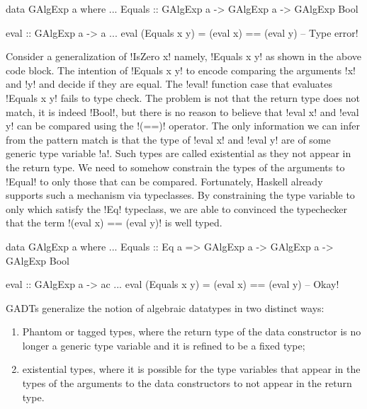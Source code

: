 \documentclass[manuscript,screen,nonacm]{acmart}
\begin{document}
\begin{minipage}[ht]{0.5\linewidth}
\begin{code}
data GAlgExp a where
  ...
  Equals :: GAlgExp a -> GAlgExp a -> GAlgExp Bool
\end{code}
\end{minipage}%
\begin{minipage}[ht]{0.4\linewidth}
\begin{code}
eval :: GAlgExp a -> a
...
eval (Equals x y) = (eval x) == (eval y) -- Type error!
\end{code}
\end{minipage}

Consider a generalization of !IsZero x! namely, !Equals x y! as shown in the above code block. The intention of !Equals x y! to encode comparing the arguments !x! and !y! and decide if they are equal. The !eval! function case that evaluates !Equals x y! fails to type check. The problem is not that the return type does not match, it is indeed !Bool!, but there is no reason to believe that !eval x! and !eval y! can be compared using the !(==)! operator. The only information we can infer from the pattern match is that the type of !eval x! and !eval y! are of some generic type variable !a!. Such types are called existential as they not appear in the return type. We need to somehow constrain the types of the arguments to !Equal! to only those that can be compared. Fortunately, Haskell already supports such a mechanism via typeclasses. By constraining the type variable to only which satisfy the !Eq! typeclass, we are able to convinced the typechecker that the term !(eval x) == (eval y)! is well typed.

\begin{minipage}[ht]{0.5\linewidth}
\begin{code}
data GAlgExp a where
...
   Equals :: Eq a => GAlgExp a -> GAlgExp a
                  -> GAlgExp Bool
\end{code}
\end{minipage}%
\begin{minipage}[ht]{0.4\linewidth}
\begin{code}
eval :: GAlgExp a -> ac
...
eval (Equals x y) = (eval x) == (eval y) -- Okay!
\end{code}
\end{minipage}

GADTs generalize the notion of algebraic datatypes in two distinct ways:
\begin{enumerate}
\item Phantom or tagged types, where the return type of the data constructor is no longer a generic type variable and it is refined to be a fixed type;
\item existential types, where it is possible for the type variables that appear in the types of the arguments to the data constructors to not appear in the return type.
\end{enumerate}
\end{document}
